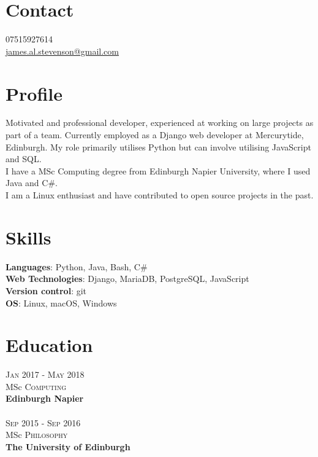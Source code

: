 \documentclass[14pt, a4paper]{extarticle}
\begin{document}
\par{\bigskip\par
\section{Contact}
\large
07515927614\\
\href{mailto:james.al.stevenson@gmail.com}{james.al.stevenson@gmail.com}\\
}

\begin{multicols}{2}

\section{Profile}
\noindent Motivated and professional developer, experienced at working on large projects as part of a team. Currently employed as a Django web developer at Mercurytide, Edinburgh. My role primarily utilises Python but can involve utilising JavaScript and SQL.\\
I have a MSc Computing degree from Edinburgh Napier University, where I used Java and C\#.\\
I am a Linux enthusiast and have contributed to open source projects in the past.

\section{Skills}
\noindent\textbf{Languages}: Python, Java, Bash, C\#\\
\textbf{Web Technologies}: Django, MariaDB, PostgreSQL, JavaScript\\
\textbf{Version control}: git\\
\textbf{OS}: Linux, macOS, Windows

\section{Education}
\noindent\textsc{Jan} 2017 - \textsc{May} 2018\\
MSc \textsc{Computing} \\
\textbf{Edinburgh Napier}\\~\\
\textsc{Sep} 2015 - \textsc{Sep} 2016\\
MSc \textsc{Philosophy} \\ 
\textbf{The University of Edinburgh}


\end{multicols}
\end{document}
